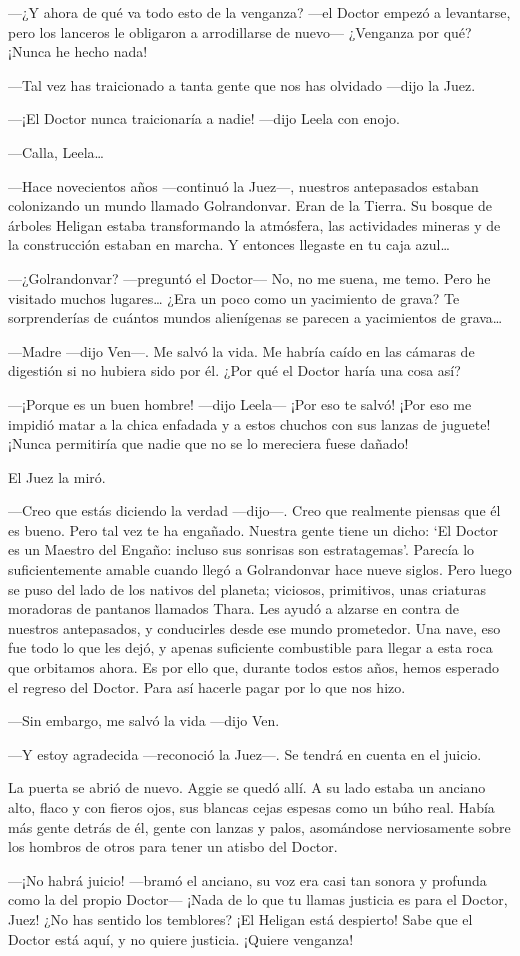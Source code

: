 ---¿Y ahora de qué va todo esto de la venganza? ---el Doctor empezó a
levantarse, pero los lanceros le obligaron a arrodillarse de nuevo---
¿Venganza por qué? ¡Nunca he hecho nada!

---Tal vez has traicionado a tanta gente que nos has olvidado ---dijo la
Juez.

---¡El Doctor nunca traicionaría a nadie! ---dijo Leela con enojo.

---Calla, Leela\ldots{}

---Hace novecientos años ---continuó la Juez---, nuestros antepasados
estaban colonizando un mundo llamado Golrandonvar. Eran de la Tierra.
Su bosque de árboles Heligan estaba transformando la atmósfera, las
actividades mineras y de la construcción estaban en marcha. Y entonces
llegaste en tu caja azul\ldots{}

---¿Golrandonvar? ---preguntó el Doctor--- No, no me suena, me temo.
Pero he visitado muchos lugares\ldots{} ¿Era un poco como un yacimiento
de grava? Te sorprenderías de cuántos mundos alienígenas se parecen a
yacimientos de grava\ldots{}

---Madre ---dijo Ven---. Me salvó la vida. Me habría caído en las
cámaras de digestión si no hubiera sido por él. ¿Por qué el Doctor haría
una cosa así?

---¡Porque es un buen hombre! ---dijo Leela--- ¡Por eso te salvó! ¡Por
eso me impidió matar a la chica enfadada y a estos chuchos con sus
lanzas de juguete! ¡Nunca permitiría que nadie que no se lo mereciera
fuese dañado!

El Juez la miró.

---Creo que estás diciendo la verdad ---dijo---. Creo que realmente
piensas que él es bueno. Pero tal vez te ha engañado. Nuestra gente
tiene un dicho: `El Doctor es un Maestro del Engaño: incluso sus
sonrisas son estratagemas'. Parecía lo suficientemente amable cuando
llegó a Golrandonvar hace nueve siglos. Pero luego se puso del lado de
los nativos del planeta; viciosos, primitivos, unas criaturas moradoras
de pantanos llamados Thara. Les ayudó a alzarse en contra de nuestros
antepasados, y conducirles desde ese mundo prometedor. Una nave, eso fue
todo lo que les dejó, y apenas suficiente combustible para llegar a esta
roca que orbitamos ahora. Es por ello que, durante todos estos años,
hemos esperado el regreso del Doctor. Para así hacerle pagar por lo que
nos hizo.

---Sin embargo, me salvó la vida ---dijo Ven.

---Y estoy agradecida ---reconoció la Juez---. Se tendrá en cuenta en el
juicio.

La puerta se abrió de nuevo. Aggie se quedó allí. A su lado estaba un
anciano alto, flaco y con fieros ojos, sus blancas cejas espesas como un
búho real. Había más gente detrás de él, gente con lanzas y palos,
asomándose nerviosamente sobre los hombros de otros para tener un atisbo
del Doctor.

---¡No habrá juicio! ---bramó el anciano, su voz era casi tan sonora y
profunda como la del propio Doctor--- ¡Nada de lo que tu llamas justicia
es para el Doctor, Juez! ¿No has sentido los temblores? ¡El Heligan está
despierto! Sabe que el Doctor está aquí, y no quiere justicia. ¡Quiere
venganza!
